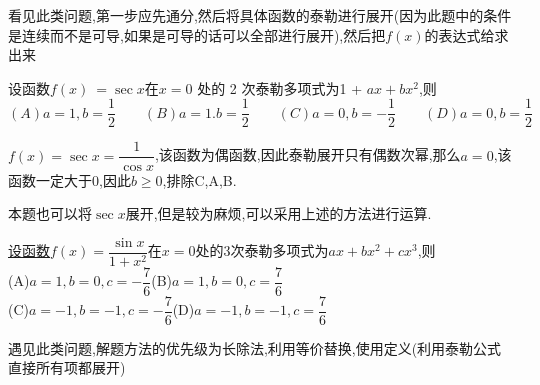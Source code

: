 \documentclass[8pt a4paper, oneside, UTF8]{ctexbook}
\begin{document}
\begin{sloppypar}
\begin{solution}
    \end{solution}
    \begin{note}
        看见此类问题,第一步应先通分,然后将具体函数的泰勒进行展开(因为此题中的条件是连续而不是可导,如果是可导的话可以全部进行展开),然后把$f(x)$的表达式给求出来
    \end{note}
    \begin{problem}
        设函数$f(x)\:=\sec x$在$x=0$ 处的 2 次泰勒多项式为1 + $ax+bx^2$,则\\
        $(A)a=1,b=\dfrac{1}{2}  \qquad (B)a=1.b=\dfrac{1}{2}  \qquad (C)a=0,b=-\dfrac{1}{2} \qquad  (D)a=0,b=\dfrac{1}{2}$
    \end{problem}
    \begin{solution}
        $f(x)=\sec x=\dfrac{1}{\cos x}$,该函数为偶函数,因此泰勒展开只有偶数次幂,那么$a=0$,该函数一定大于0,因此$b \geq 0$,排除C,A,B.
    \end{solution}
    \begin{note}
        本题也可以将$\sec x$展开,但是较为麻烦,可以采用上述的方法进行运算.
    \end{note}
    \begin{problem}
       \uline{设函数}$f(x)=\dfrac{\sin x}{1+x^2}$在$x=0$处的3次泰勒多项式为$ax + b x ^ 2 + c x ^ 3 $,则
        \\(A)$a=1,b=0,c=-\dfrac{7}{6}$\quad (B)$a=1,b=0,c=\dfrac{7}{6}$\\ (C)$a=-1,b=-1,c=-\dfrac{7}{6}$\quad (D)$a=-1,b=-1,c=\dfrac{7}{6}$
    \end{problem}
    \begin{note}
        遇见此类问题,解题方法的优先级为长除法,利用等价替换,使用定义(利用泰勒公式直接所有项都展开)
    \end{note}

\end{sloppypar}
\end{document}
